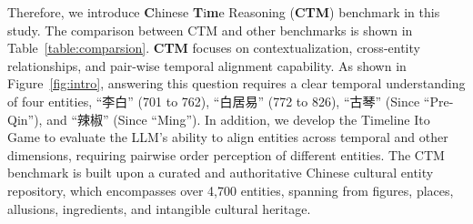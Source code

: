 \begin{table*}[t]
\small
\centering
\caption{\textbf{Comparison} between CTM and other benchmarks.
Detailed discussion is presented in Appendix~\ref{app:rw}.}
\label{table:comparsion}
\end{table*}


Therefore, we introduce \textbf{C}hinese \textbf{T}i\textbf{m}e Reasoning (\textbf{CTM}) benchmark in this study.
The comparison between CTM and other benchmarks is shown in Table~\ref{table:comparsion}.
\textbf{CTM} focuses on contextualization, cross-entity relationships, and pair-wise temporal alignment capability.
As shown in Figure~\ref{fig:intro}, answering this question requires a clear temporal understanding of four entities, ``李白'' (701 to 762), ``白居易'' (772 to 826), ``古琴'' (Since ``Pre-Qin''), and ``辣椒'' (Since ``Ming'').
In addition, we develop the Timeline Ito Game to evaluate the LLM's ability to align entities across temporal and other dimensions, requiring pairwise order perception of different entities.
The CTM benchmark is built upon a curated and authoritative Chinese cultural entity repository, which encompasses over 4,700 entities, spanning from figures, places, allusions, ingredients, and intangible cultural heritage.

